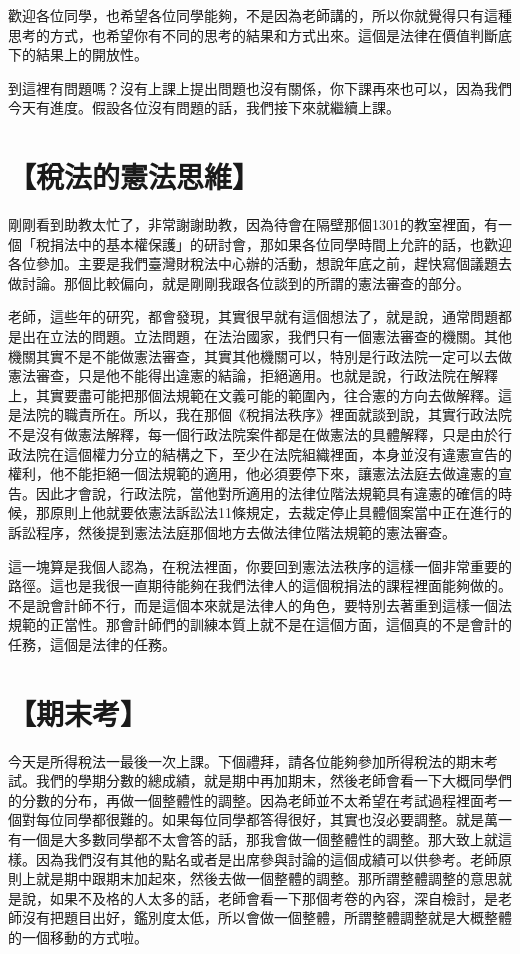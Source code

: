 \documentclass[oneside,sub3section]{ctexbook}
\begin{document}
歡迎各位同學，也希望各位同學能夠，不是因為老師講的，所以你就覺得只有這種思考的方式，也希望你有不同的思考的結果和方式出來。這個是法律在價值判斷底下的結果上的開放性。

到這裡有問題嗎？沒有上課上提出問題也沒有關係，你下課再來也可以，因為我們今天有進度。假設各位沒有問題的話，我們接下來就繼續上課。

\hypertarget{ux7a05ux6cd5ux7684ux61b2ux6cd5ux601dux7dad}{%
\chapter{【稅法的憲法思維】}\label{ux7a05ux6cd5ux7684ux61b2ux6cd5ux601dux7dad}}

剛剛看到助教太忙了，非常謝謝助教，因為待會在隔壁那個1301的教室裡面，有一個「稅捐法中的基本權保護」的研討會，那如果各位同學時間上允許的話，也歡迎各位參加。主要是我們臺灣財稅法中心辦的活動，想說年底之前，趕快寫個議題去做討論。那個比較偏向，就是剛剛我跟各位談到的所謂的憲法審查的部分。

老師，這些年的研究，都會發現，其實很早就有這個想法了，就是說，通常問題都是出在立法的問題。立法問題，在法治國家，我們只有一個憲法審查的機關。其他機關其實不是不能做憲法審查，其實其他機關可以，特別是行政法院一定可以去做憲法審查，只是他不能得出違憲的結論，拒絕適用。也就是說，行政法院在解釋上，其實要盡可能把那個法規範在文義可能的範圍內，往合憲的方向去做解釋。這是法院的職責所在。所以，我在那個《稅捐法秩序》裡面就談到說，其實行政法院不是沒有做憲法解釋，每一個行政法院案件都是在做憲法的具體解釋，只是由於行政法院在這個權力分立的結構之下，至少在法院組織裡面，本身並沒有違憲宣告的權利，他不能拒絕一個法規範的適用，他必須要停下來，讓憲法法庭去做違憲的宣告。因此才會說，行政法院，當他對所適用的法律位階法規範具有違憲的確信的時候，那原則上他就要依憲法訴訟法11條規定，去裁定停止具體個案當中正在進行的訴訟程序，然後提到憲法法庭那個地方去做法律位階法規範的憲法審查。

這一塊算是我個人認為，在稅法裡面，你要回到憲法法秩序的這樣一個非常重要的路徑。這也是我很一直期待能夠在我們法律人的這個稅捐法的課程裡面能夠做的。不是說會計師不行，而是這個本來就是法律人的角色，要特別去著重到這樣一個法規範的正當性。那會計師們的訓練本質上就不是在這個方面，這個真的不是會計的任務，這個是法律的任務。

\hypertarget{ux671fux672bux8003}{%
\chapter{【期末考】}\label{ux671fux672bux8003}}

今天是所得稅法一最後一次上課。下個禮拜，請各位能夠參加所得稅法的期末考試。我們的學期分數的總成績，就是期中再加期末，然後老師會看一下大概同學們的分數的分布，再做一個整體性的調整。因為老師並不太希望在考試過程裡面考一個對每位同學都很難的。如果每位同學都答得很好，其實也沒必要調整。就是萬一有一個是大多數同學都不太會答的話，那我會做一個整體性的調整。那大致上就這樣。因為我們沒有其他的點名或者是出席參與討論的這個成績可以供參考。老師原則上就是期中跟期末加起來，然後去做一個整體的調整。那所謂整體調整的意思就是說，如果不及格的人太多的話，老師會看一下那個考卷的內容，深自檢討，是老師沒有把題目出好，鑑別度太低，所以會做一個整體，所謂整體調整就是大概整體的一個移動的方式啦。



\backmatter
\printindex
\end{document}
